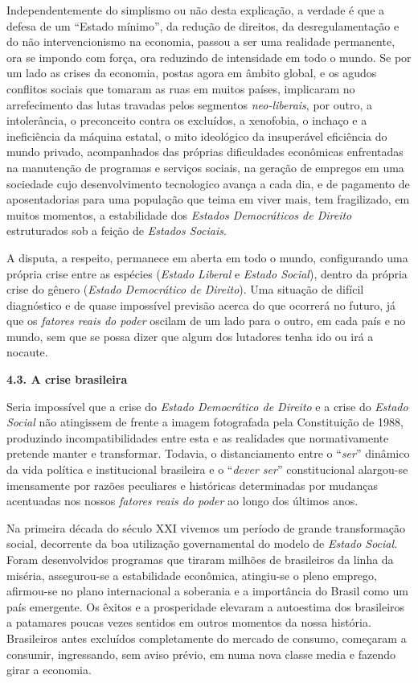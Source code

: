 Independentemente do simplismo ou não desta explicação, a verdade é que
a defesa de um ``Estado mínimo'', da redução de direitos, da
desregulamentação e do não intervencionismo na economia, passou a ser
uma realidade permanente, ora se impondo com força, ora reduzindo de
intensidade em todo o mundo. Se por um lado as crises da economia,
postas agora em âmbito global, e os agudos conflitos sociais que tomaram
as ruas em muitos países, implicaram no arrefecimento das lutas travadas
pelos segmentos \emph{neo-liberais}, por outro, a intolerância, o
preconceito contra os excluídos, a xenofobia, o inchaço e a ineficiência
da máquina estatal, o mito ideológico da insuperável eficiência do mundo
privado, acompanhados das próprias dificuldades econômicas enfrentadas
na manutenção de programas e serviços sociais, na geração de empregos em
uma sociedade cujo desenvolvimento tecnologico avança a cada dia, e de
pagamento de aposentadorias para uma população que teima em viver mais,
tem fragilizado, em muitos momentos, a estabilidade dos \emph{Estados
Democráticos de Direito} estruturados sob a feição de \emph{Estados
Sociais}.

A disputa, a respeito, permanece em aberta em todo o mundo, configurando
uma própria crise entre as espécies (\emph{Estado Liberal} e
\emph{Estado Social}), dentro da própria crise do gênero (\emph{Estado
Democrático de Direito}). Uma situação de difícil diagnóstico e de quase
impossível previsão acerca do que ocorrerá no futuro, já que os
\emph{fatores reais do poder} oscilam de um lado para o outro\emph{,} em
cada país e no mundo, sem que se possa dizer que algum dos lutadores
tenha ido ou irá a nocaute.

\textbf{4.3. A crise brasileira}

Seria impossível que a crise do \emph{Estado Democrático de Direito} e a
crise do \emph{Estado Social} não atingissem de frente a imagem
fotografada pela Constituição de 1988, produzindo incompatibilidades
entre esta e as realidades que normativamente pretende manter e
transformar. Todavia, o distanciamento entre o ``\emph{ser}'' dinâmico
da vida política e institucional brasileira e o ``\emph{dever ser}''
constitucional alargou-se imensamente por razões peculiares e históricas
determinadas por mudanças acentuadas nos nossos \emph{fatores reais do
poder} ao longo dos últimos anos.

Na primeira década do século XXI vivemos um período de grande
transformação social, decorrente da boa utilização governamental do
modelo de \emph{Estado Social.} Foram desenvolvidos programas que
tiraram milhões de brasileiros da linha da miséria, assegurou-se a
estabilidade econômica, atingiu-se o pleno emprego, afirmou-se no plano
internacional a soberania e a importância do Brasil como um país
emergente. Os êxitos e a prosperidade elevaram a autoestima dos
brasileiros a patamares poucas vezes sentidos em outros momentos da
nossa história. Brasileiros antes excluídos completamente do mercado de
consumo, começaram a consumir, ingressando, sem aviso prévio, em numa
nova classe media e fazendo girar a economia.

